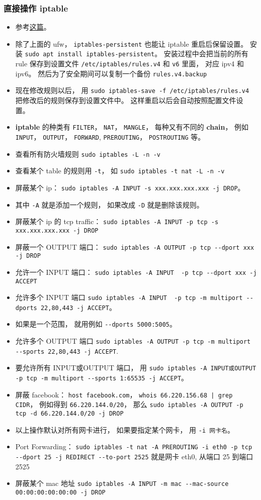 \subsubsection{直接操作 iptable}
\begin{itemize}
\item 参考\href{https://www.cyberciti.biz/faq/how-to-save-iptables-firewall-rules-permanently-on-linux/}{这篇}。
\item 除了上面的 ufw， \verb`iptables-persistent` 也能让 iptable 重启后保留设置。 安装 \verb`sudo apt install iptables-persistent`。 安装过程中会把当前的所有 rule 保存到设置文件 \verb`/etc/iptables/rules.v4` 和 \verb`v6` 里面， 对应 ipv4 和 ipv6。 然后为了安全期间可以复制一个备份 \verb`rules.v4.backup`
\item 现在修改规则以后， 用 \verb`sudo iptables-save -f /etc/iptables/rules.v4` 把修改后的规则保存到设置文件中。 这样重启以后会自动按照配置文件设置。
\item \textbf{iptable} 的种类有 \verb`FILTER`， \verb`NAT`， \verb`MANGLE`， 每种又有不同的 \textbf{chain}， 例如 \verb`INPUT`， \verb`OUTPUT`， \verb`FORWARD`,  \verb`PREROUTING`， \verb`POSTROUTING` 等。
\item 查看所有防火墙规则 \verb`sudo iptables -L -n -v`
\item 查看某个 table 的规则用 \verb`-t`， 如 \verb`sudo iptables -t nat -L -n -v`
\item 屏蔽某个 ip： \verb`sudo iptables -A INPUT -s xxx.xxx.xxx.xxx -j DROP`。
\item 其中 \verb`-A` 就是添加一个规则， 如果改成 \verb`-D` 就是删除该规则。
\item 屏蔽某个 ip 的 tcp traffic： \verb`sudo iptables -A INPUT -p tcp -s xxx.xxx.xxx.xxx -j DROP`
\item 屏蔽一个 OUTPUT 端口： \verb`sudo iptables -A OUTPUT -p tcp --dport xxx -j DROP`
\item 允许一个 INPUT 端口：  \verb`sudo iptables -A INPUT  -p tcp --dport xxx -j ACCEPT`
\item 允许多个 INPUT 端口 \verb`sudo iptables -A INPUT  -p tcp -m multiport --dports 22,80,443 -j ACCEPT`。
\item 如果是一个范围， 就用例如 \verb`--dports 5000:5005`。
\item 允许多个 OUTPUT 端口 \verb`sudo iptables -A OUTPUT -p tcp -m multiport --sports 22,80,443 -j ACCEPT`.
\item 要允许所有 INPUT或OUTPUT 端口， 用 \verb`sudo iptables -A INPUT或OUTPUT -p tcp -m multiport --sports 1:65535 -j ACCEPT`。
\item 屏蔽 facebook： \verb`host facebook.com`， \verb`whois 66.220.156.68 | grep CIDR`， 例如得到 \verb`66.220.144.0/20`， 那么 \verb`sudo iptables -A OUTPUT -p tcp -d 66.220.144.0/20 -j DROP`
\item 以上操作默认对所有网卡进行， 如果要指定某个网卡， 用 \verb`-i 网卡名`。
\item Port Forwarding： \verb`sudo iptables -t nat -A PREROUTING -i eth0 -p tcp --dport 25 -j REDIRECT --to-port 2525` 就是网卡 eth0, 从端口 25 到端口 2525
\item 屏蔽某个 mac 地址 \verb`sudo iptables -A INPUT -m mac --mac-source 00:00:00:00:00:00 -j DROP`
\end{itemize}

